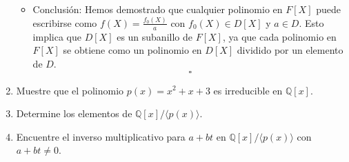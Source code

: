 \documentclass[12pt]{article}
\theoremstyle{definition}
\theoremstyle{remark}
\begin{document}
\begin{enumerate}
\begin{itemize}
        \item Conclusión: Hemos demostrado que cualquier polinomio en $F[X]$ puede escribirse como $f(X) = \frac{f_0(X)}{a}$ con $f_0(X) \in D[X]$ y $a \in D$. Esto implica que $D[X]$ es un subanillo de $F[X]$, ya que cada polinomio en $F[X]$ se obtiene como un polinomio en $D[X]$ dividido por un elemento de $D$.
        \[
        \square
        \]
    \end{itemize}

    \item Muestre que el polinomio \( p(x) = x^2 + x + 3 \) es irreducible en \( \mathbb{Q}[x] \).
    \item Determine los elementos de \( \mathbb{Q}[x] / \langle p(x) \rangle \).
    \item Encuentre el inverso multiplicativo para \( a + b t \) en \( \mathbb{Q}[x] / \langle p(x) \rangle \) con \( a + b t \neq 0 \).

\end{enumerate}
\end{document}
